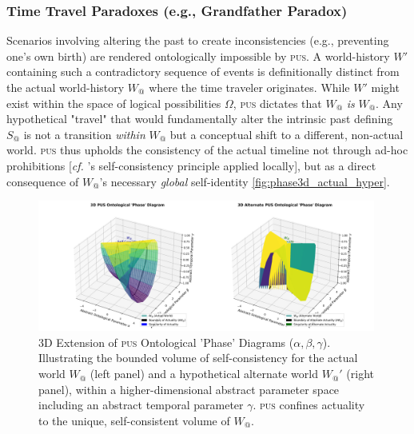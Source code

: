\documentclass[11pt, a4paper]{article}
\makeatletter
\newcommand{\pus}{\textsc{pus}} %
\newcommand{\Wactual}{W_{@}} %
\newcommand{\Sactual}{S_{@}} %
\newcommand{\Omegaset}{\Omega} %
\makeatother
\begin{document}
\subsubsection{Time Travel Paradoxes (e.g., Grandfather Paradox)}
Scenarios involving altering the past to create inconsistencies (e.g., preventing one's own birth) are rendered ontologically impossible by \pus. A world-history $W'$ containing such a contradictory sequence of events is definitionally distinct from the actual world-history $\Wactual$ where the time traveler originates. While $W'$ might exist within the space of logical possibilities $\Omegaset$, \pus{} dictates that $\Wactual$ \textit{is} $\Wactual$. Any hypothetical "travel" that would fundamentally alter the intrinsic past defining $\Sactual$ is not a transition \textit{within} $\Wactual$ but a conceptual shift to a different, non-actual world. \pus{} thus upholds the consistency of the actual timeline not through ad-hoc prohibitions [\textit{cf.} \citealp{novikov1990}'s self-consistency principle applied locally], but as a direct consequence of $\Wactual$'s necessary \textit{global} self-identity \ref{fig:phase3d_actual_hyper}.

\begin{figure}[htbp]
    \centering
    \includegraphics[width=0.99\textwidth]{figures/double_3d_pus_phase_diagram.png} %
    \caption{3D Extension of \pus{} Ontological 'Phase' Diagrams ($\alpha, \beta, \gamma$). Illustrating the bounded volume of self-consistency for the actual world $\Wactual$ (left panel) and a hypothetical alternate world $\Wactual'$ (right panel), within a higher-dimensional abstract parameter space including an abstract temporal parameter $\gamma$. \pus{} confines actuality to the unique, self-consistent volume of $\Wactual$.}
    \label{fig:phase3d}
\end{figure}
\FloatBarrier 
\end{document}
